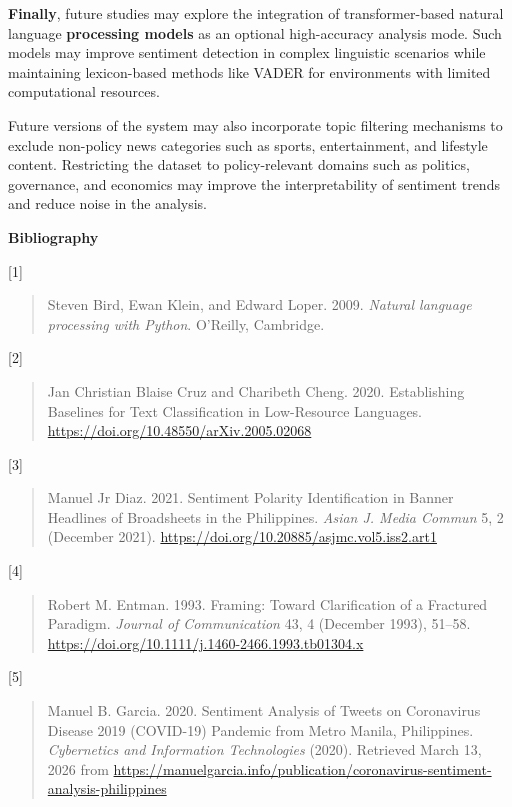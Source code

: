 \textbf{Finally}, future studies may explore the integration of transformer-based natural language \textbf{processing models} as an optional high-accuracy analysis mode. Such models may improve sentiment detection in complex linguistic scenarios while maintaining lexicon-based methods like VADER for environments with limited computational resources.

Future versions of the system may also incorporate topic filtering mechanisms to exclude non-policy news categories such as sports, entertainment, and lifestyle content. Restricting the dataset to policy-relevant domains such as politics, governance, and economics may improve the interpretability of sentiment trends and reduce noise in the analysis.

\textbf{Bibliography}

{[}1{]}

\begin{quote}
Steven Bird, Ewan Klein, and Edward Loper. 2009. \emph{Natural language processing with Python}. O'Reilly, Cambridge.
\end{quote}

{[}2{]}

\begin{quote}
Jan Christian Blaise Cruz and Charibeth Cheng. 2020. Establishing Baselines for Text Classification in Low-Resource Languages. \url{https://doi.org/10.48550/arXiv.2005.02068}
\end{quote}

{[}3{]}

\begin{quote}
Manuel Jr Diaz. 2021. Sentiment Polarity Identification in Banner Headlines of Broadsheets in the Philippines. \emph{Asian J. Media Commun} 5, 2 (December 2021). \url{https://doi.org/10.20885/asjmc.vol5.iss2.art1}
\end{quote}

{[}4{]}

\begin{quote}
Robert M. Entman. 1993. Framing: Toward Clarification of a Fractured Paradigm. \emph{Journal of Communication} 43, 4 (December 1993), 51--58. \url{https://doi.org/10.1111/j.1460-2466.1993.tb01304.x}
\end{quote}

{[}5{]}

\begin{quote}
Manuel B. Garcia. 2020. Sentiment Analysis of Tweets on Coronavirus Disease 2019 (COVID-19) Pandemic from Metro Manila, Philippines. \emph{Cybernetics and Information Technologies} (2020). Retrieved March 13, 2026 from \url{https://manuelgarcia.info/publication/coronavirus-sentiment-analysis-philippines}
\end{quote}


